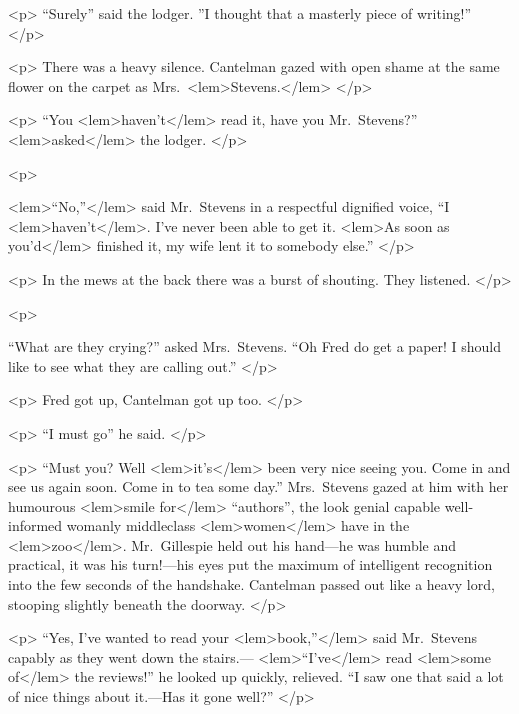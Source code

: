 {{				<p>
				“Surely” said the lodger. ”I thought that a masterly piece of writing!” 
 				</p> 

				<p>
				There was a heavy silence. Cantelman gazed with open shame at the same flower on the 
				carpet as Mrs.\ 
<lem>Stevens.</lem>{} 
 				</p> 

				<p>
				“You 
<lem>haven't</lem>{} read it, have you Mr.\ Stevens?” 
<lem>asked</lem>
					{} 
				the lodger. 
 				</p> 

				<p>
				
<lem>“No,”</lem>
					{} 
				said Mr.\ Stevens in a respectful dignified voice, “I 
<lem>haven't</lem>{}. I've never been 
				able to get it. 
<lem>As soon as you'd</lem>
					{} 
				finished it, my wife lent it to somebody else.” 
 				</p> 

				<p>
				In the mews at the back there was a burst of shouting. They listened. 
				</p> 

				<p>
				 
				“What are they crying?” asked Mrs.\ Stevens. “Oh Fred do get a paper! I should like to 
				see what they are calling out.” 
 				</p> 

				<p>
				Fred got up, Cantelman got up too. 
 				</p> 

				<p>
				“I must go” he said. 
 				</p> 

				<p>
				“Must you? Well 
<lem>it's</lem>{}  been very nice seeing you. Come in and see us again soon. Come in 
to tea some day.” Mrs.\ Stevens gazed at him with her humourous 
<lem>smile for</lem>
					{} 
				“authors”, 
				the look genial capable well-informed womanly middleclass 
<lem>women</lem>
					{} 
				have in the 
<lem>zoo</lem>{}. 
				Mr.\ Gillespie held out his hand---he was humble and practical, it was his turn!---his 
				eyes put the maximum of intelligent recognition into the few seconds of the handshake. 
				Cantelman passed out like a heavy lord, stooping slightly beneath the doorway. 
 				</p> 

				<p>
				“Yes, I've wanted to read your 
<lem>book,”</lem>{} said Mr.\ Stevens capably as they went down the 
				stairs.---
<lem>“I've</lem>{} read 
<lem>some of</lem>
					{}
				the reviews!” he looked up quickly, relieved. “I saw one 
				that said a lot of nice things about it.---Has it gone well?” 
 				</p> 

}}
